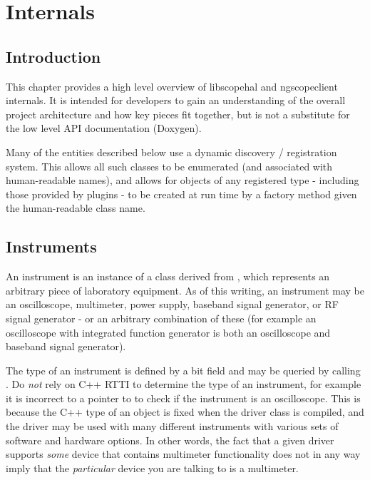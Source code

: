 \chapter{Internals}

\section{Introduction}

This chapter provides a high level overview of libscopehal and ngscopeclient internals. It is intended for developers
to gain an understanding of the overall project architecture and how key pieces fit together, but is not a substitute
for the low level API documentation (Doxygen).

Many of the entities described below use a dynamic discovery / registration system. This allows all such classes to be
enumerated (and associated with human-readable names), and allows for objects of any registered type - including those
provided by plugins - to be created at run time by a factory method given the human-readable class name.

\section{Instruments}
\label{sec:instruments}

An instrument is an instance of a class derived from , which represents an arbitrary piece of
laboratory equipment. As of this writing, an instrument may be an oscilloscope, multimeter, power supply, baseband
signal generator, or RF signal generator - or an arbitrary combination of these (for example an oscilloscope with
integrated function generator is both an oscilloscope and baseband signal generator).

The type of an instrument is defined by a bit field and may be queried by calling . Do
\emph{not} rely on C++ RTTI to determine the type of an instrument, for example it is incorrect to
 a  pointer to  to check if the instrument is
an oscilloscope. This is because the C++ type of an object is fixed when the driver class is compiled, and the driver
may be used with many different instruments with various sets of software and hardware options. In other words, the
fact that a given driver supports \emph{some} device that contains multimeter functionality does not in any way imply
that the \emph{particular} device you are talking to is a multimeter.

